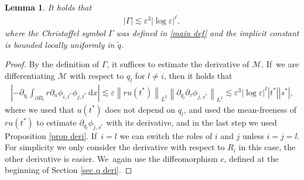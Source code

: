 \documentclass[JEP,XML,SOM,Unicode,published]{cedram}
\let\epsilon\varepsilon
\newtheorem{lemma}[theorem]{Lemma}
\theoremstyle{definition}
\newcommand\norm[1]{\left\lVert #1\right\rVert}
\newcommand\dd{\,\mathrm{d}}
\newcommand\dx{\dd x}
\let\de\partial
\let\eps\epsilon
\begin{document}
\begin{lemma}\label{conv Gamma}
It holds that
\begin{align*}
|\Gamma|\lesssim \eps^3|{\log\eps}|^\ell,
\end{align*}
where the Christoffel symbol $\Gamma$ was defined in \ref{main def} and the implicit constant is bounded locally uniformly in $\tilde{q}$.
\end{lemma}
\begin{proof}
By the definition of $\Gamma$, it suffices to estimate the derivative of $\mathcal{M}$. If~we are differentiating $\mathcal{M}$ with respect to $q_l$ for $l\neq i$, then it holds that
\begin{align*}
\left|-\de_{q_l}\int_{\de B_i}r\de_n\phi_{i,t^*}\phi_{j,t^*}\dx\right|\lesssim \eps\norm{ru(t^*)}_{L^2}\norm{\de_{q_l}\de_\tau\phi_{j,s^*}}_{L^2}\lesssim \eps^3|{\log\eps}|^\ell|t^*||s^*|,
\end{align*}
where we used that $u(t^*)$ does not depend on $q_l$, and used the mean-freeness of $ru(t^*)$ to estimate $\de_{q_l}\phi_{j,s^*}$ with its derivative, and in the last step we used Proposition \ref{prop deri}. If~$i=l$ we can switch the roles of $i$ and $j$ unless $i=j=l$. For simplicity we only consider the derivative with respect to $R_i$ in this case, the other derivative is easier. We~again use the diffeomorphism $c$, defined at the beginning of Section \ref{sec q deri}.


\end{proof}
\end{document}
